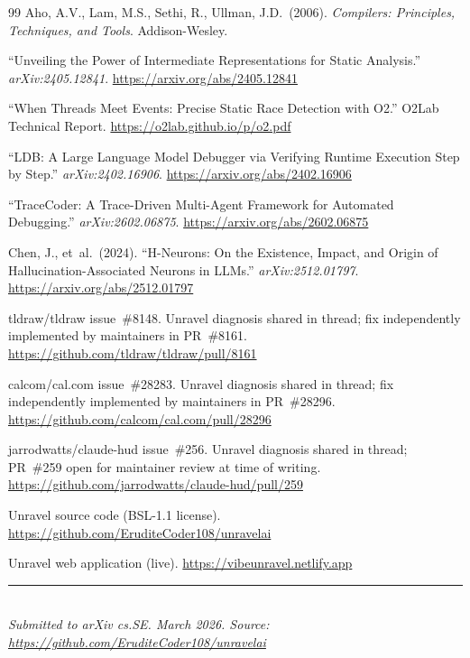 \documentclass[12pt,a4paper]{article}
\begin{document}
\begin{thebibliography}{99}
  Aho, A.V., Lam, M.S., Sethi, R., Ullman, J.D.\ (2006).
  \textit{Compilers: Principles, Techniques, and Tools}.
  Addison-Wesley.

  ``Unveiling the Power of Intermediate Representations for Static Analysis.''
  \textit{arXiv:2405.12841}.
  \url{https://arxiv.org/abs/2405.12841}

  ``When Threads Meet Events: Precise Static Race Detection with O2.''
  O2Lab Technical Report.
  \url{https://o2lab.github.io/p/o2.pdf}

  ``LDB: A Large Language Model Debugger via Verifying Runtime Execution Step by Step.''
  \textit{arXiv:2402.16906}.
  \url{https://arxiv.org/abs/2402.16906}

  ``TraceCoder: A Trace-Driven Multi-Agent Framework for Automated Debugging.''
  \textit{arXiv:2602.06875}.
  \url{https://arxiv.org/abs/2602.06875}

  Chen, J., et~al.\ (2024).
  ``H-Neurons: On the Existence, Impact, and Origin of Hallucination-Associated Neurons in LLMs.''
  \textit{arXiv:2512.01797}.
  \url{https://arxiv.org/abs/2512.01797}

  tldraw/tldraw issue~\#8148. Unravel diagnosis shared in thread; fix independently
  implemented by maintainers in PR~\#8161.
  \url{https://github.com/tldraw/tldraw/pull/8161}

  calcom/cal.com issue~\#28283. Unravel diagnosis shared in thread; fix independently
  implemented by maintainers in PR~\#28296.
  \url{https://github.com/calcom/cal.com/pull/28296}

  jarrodwatts/claude-hud issue~\#256. Unravel diagnosis shared in thread;
  PR~\#259 open for maintainer review at time of writing.
  \url{https://github.com/jarrodwatts/claude-hud/pull/259}

  Unravel source code (BSL-1.1 license).
  \url{https://github.com/EruditeCoder108/unravelai}

  Unravel web application (live).
  \url{https://vibeunravel.netlify.app}

\end{thebibliography}

\vspace{12pt}
\noindent\textcolor{rulecolor}{\rule{\linewidth}{0.6pt}}\\
{\small\itshape Submitted to arXiv cs.SE. March 2026. \quad
Source: \url{https://github.com/EruditeCoder108/unravelai}}
\end{document}
